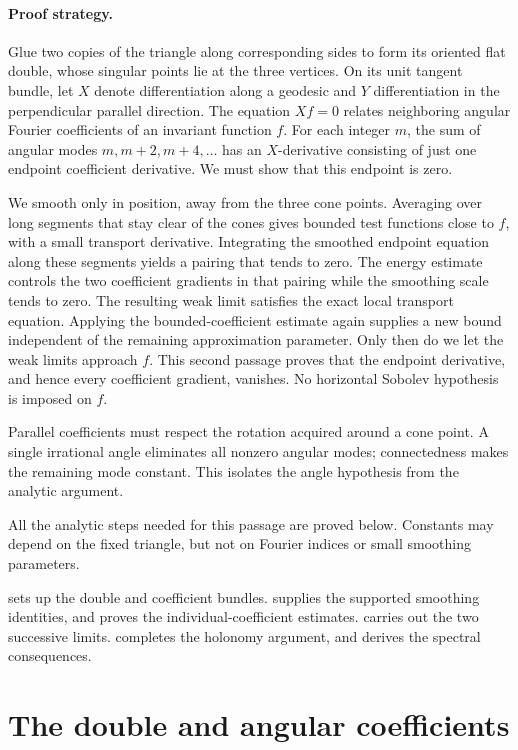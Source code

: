 \documentclass[11pt]{article}
\theoremstyle{remark}
\begin{document}
\paragraph{Proof strategy.}
Glue two copies of the triangle along corresponding sides to form its
oriented flat double, whose singular points lie at the three vertices.
On its unit tangent bundle, let \(X\) denote
differentiation along a geodesic and \(Y\) differentiation in the
perpendicular parallel direction. The equation \(Xf=0\) relates
neighboring angular Fourier coefficients of an invariant function \(f\).
For each integer \(m\), the sum of angular modes \(m,m+2,m+4,\ldots\)
has an \(X\)-derivative consisting of just one endpoint coefficient
derivative. We must show that this endpoint is zero.

We smooth only in position, away from the three cone points. Averaging
over long segments that stay clear of the cones gives bounded test
functions close to \(f\), with a small transport derivative. Integrating
the smoothed endpoint equation along these segments yields a pairing
that tends to zero. The energy estimate controls the two coefficient
gradients in that pairing while the smoothing scale tends to zero.
The resulting weak limit satisfies the exact local transport equation.
Applying the bounded-coefficient estimate again supplies a new bound
independent of the remaining approximation parameter. Only then do we
let the weak limits approach \(f\). This second passage proves that the
endpoint derivative, and hence every coefficient gradient, vanishes.
No horizontal Sobolev hypothesis is imposed on \(f\).

Parallel coefficients must respect the rotation acquired around a cone
point. A single irrational angle eliminates all nonzero angular modes;
connectedness makes the remaining mode constant. This isolates the
angle hypothesis from the analytic argument.

All the analytic steps needed for this passage are proved below. Constants
may depend on the fixed triangle, but not on Fourier indices or small
smoothing parameters.

 sets up the double and coefficient bundles.
 supplies the supported smoothing identities, and
 proves the individual-coefficient estimates.
 carries out the two successive limits.
 completes the holonomy argument, and
 derives the spectral consequences.

\section{The double and angular coefficients}\label{sec:geometry}
\end{document}
